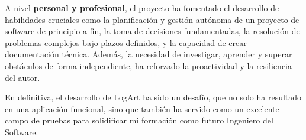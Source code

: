 A nivel \textbf{personal y profesional}, el proyecto ha fomentado el desarrollo de habilidades cruciales como la planificación y gestión autónoma de un proyecto de software de principio a fin, la toma de decisiones fundamentadas, la resolución de problemas complejos bajo plazos definidos, y la capacidad de crear documentación técnica. Además, la necesidad de investigar, aprender y superar obstáculos de forma independiente, ha reforzado la proactividad y la resiliencia del autor.

En definitiva, el desarrollo de LogArt ha sido un desafío, que no solo ha resultado en una aplicación funcional, sino que también ha servido como un excelente campo de pruebas para solidificar mi formación como futuro Ingeniero del Software.